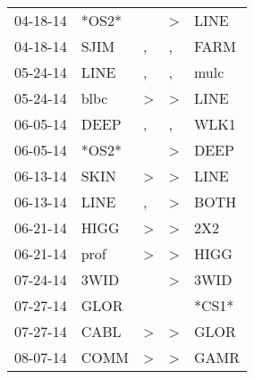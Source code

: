 \begin{supertabular}{p{0.07\textwidth}p{0.06\textwidth}p{0.02\textwidth}p{0.02\textwidth}p{0.06\textwidth}}
          04-18-14\textsuperscript{} &                            *OS2* &                  &     \textgreater &           LINE\textsuperscript{} \\
          04-18-14\textsuperscript{} &           SJIM\textsuperscript{} &                , &                , &           FARM\textsuperscript{} \\
          05-24-14\textsuperscript{} &           LINE\textsuperscript{} &                , &                , &           mulc\textsuperscript{} \\
          05-24-14\textsuperscript{} &           blbc\textsuperscript{} &     \textgreater &     \textgreater &           LINE\textsuperscript{} \\
          06-05-14\textsuperscript{} &           DEEP\textsuperscript{} &                , &                , &           WLK1\textsuperscript{} \\
          06-05-14\textsuperscript{} &                            *OS2* &                  &     \textgreater &           DEEP\textsuperscript{} \\
          06-13-14\textsuperscript{} &           SKIN\textsuperscript{} &     \textgreater &     \textgreater &           LINE\textsuperscript{} \\
          06-13-14\textsuperscript{} &           LINE\textsuperscript{} &                , &     \textgreater &           BOTH\textsuperscript{} \\
          06-21-14\textsuperscript{} &           HIGG\textsuperscript{} &     \textgreater &     \textgreater &            2X2\textsuperscript{} \\
          06-21-14\textsuperscript{} &           prof\textsuperscript{} &     \textgreater &     \textgreater &           HIGG\textsuperscript{} \\
          07-24-14\textsuperscript{} &           3WID\textsuperscript{} &                  &     \textgreater &           3WID\textsuperscript{} \\
          07-27-14\textsuperscript{} &           GLOR\textsuperscript{} &                  &                  &                            *CS1* \\
          07-27-14\textsuperscript{} &           CABL\textsuperscript{} &     \textgreater &     \textgreater &           GLOR\textsuperscript{} \\
          08-07-14\textsuperscript{} &           COMM\textsuperscript{} &     \textgreater &     \textgreater &           GAMR\textsuperscript{} \\

\end{supertabular}
